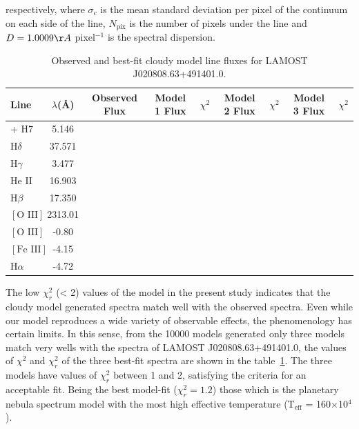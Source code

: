 \documentclass[fleqn,usenatbib]{mnras}
\begin{document}
{respectively, where $\sigma_{c}$ is the mean standard deviation per pixel of
the continuum on each side of the line, $N_{\text{pix}}$ is the number of pixels
under the line and $D = 1.0009 \AA$ pixel$^{-1}$ is the spectral dispersion.

\begin{table}
	\centering
	\caption{Observed and best-fit {\sc cloudy}  model line fluxes for LAMOST J020808.63+491401.0.}
	\label{tab:abundances}
	\begin{tabular}{lcccccccc} %
                \hline
		\hline
		Line & $\lambda$(\AA) & Observed Flux  & Model 1 Flux & $\chi^{2}$ & Model 2 Flux &  $\chi^{2}$ & Model 3 Flux &  $\chi^{2}$ \\
		\hline
		[Ne III] + H7  & 5.146 \\
		H{$\delta$} & 37.571 \\
		H{$\gamma$}  & 3.477 \\
                He II & 16.903 \\
                H{$\beta$} & 17.350 \\
                $[\text{O III}]$ & 2313.01 \\
                $[\text{O III}]$ & -0.80 \\
                $[\text{Fe III}]$ & -4.15 \\
                H{$\alpha$} & -4.72 
                \hline
	\end{tabular}
\end{table}

The low $\chi^{2}_{r}$
 (< 2) values of the model in the present study indicates
that the {\sc cloudy} model generated spectra match well with
the observed spectra. Even while our model reproduces a wide variety
of observable effects, the phenomenology has certain limits.
In this sense, from the 10000 models generated only three models
match very wells with the spectra of  LAMOST J020808.63+491401.0,
the values of $\chi^{2}$ and $\chi^{2}_{r}$ of the three best-fit spectra
are shown in the table~\ref{tab:abundances}. The three
models have values of $\chi^{2}_{r}$ between 1 and 2, satisfying
the criteria for an acceptable fit. Being the best model-fit ($\chi^{2}_{r} = 1.2$)
those which is the  planetary nebula spectrum model with the
most high effective temperature (T$_{\text{eff}}$ = 160$\times$10$^{4}$).

}
\end{document}
